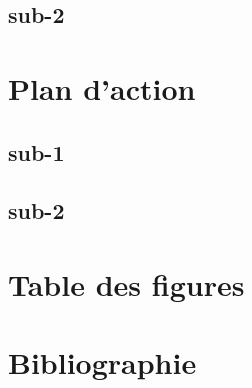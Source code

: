 \documentclass[12pt]{article}
\begin{document}
\subsection{sub-2}

\section{Plan d'action}

\subsection{sub-1}

\subsection{sub-2}


\newpage


\section*{Table des figures}
\makeatletter
{}%
\makeatother
{}%


\nocite{*}
\section*{Bibliographie}
\printbibliography[heading=none]
%

\end{document}
